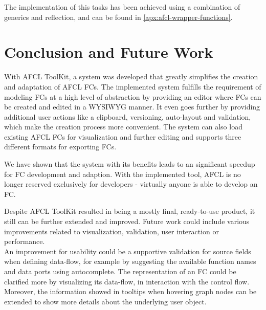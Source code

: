 \documentclass[a4paper,top=25mm,bottom=25mm,12pt,pdftex,halfparskip,twoside,openany,bibtotoc,numbers=noenddot]{scrbook}
\begin{document}
The implementation of this tasks has been achieved using a combination of generics and reflection, and can be found in \ref{apx:afcl-wrapper-functions}.

\chapter{Conclusion and Future Work}

With AFCL ToolKit, a system was developed that greatly simplifies the creation and adaptation of AFCL FCs. 
The implemented system fulfills the requirement of modeling FCs at a high level of abstraction by providing an editor where FCs can be created and edited in a WYSIWYG manner. It even goes further by providing additional user actions like a clipboard, versioning, auto-layout and validation, which make the creation process more convenient.
The system can also load existing AFCL FCs for visualization and further editing and supports three different formats for exporting FCs.

We have shown that the system with its benefits leads to an significant speedup for FC development and adaption.
With the implemented tool, AFCL is no longer reserved exclusively for developers - virtually anyone is able to develop an FC.

Despite AFCL ToolKit resulted in being a mostly final, ready-to-use product, it still can be further extended and improved.
Future work could include various improvements related to visualization, validation, user interaction or performance.\\
An improvement for usability could be a supportive validation for source fields when defining data-flow, for example by suggesting the available function names and data ports using autocomplete.
The representation of an FC could be clarified more by visualizing its data-flow, in interaction with the control flow.
Moreover, the information showed in tooltips when hovering graph nodes can be extended to show more details about the underlying user object.



\printbibliography
\end{document}
